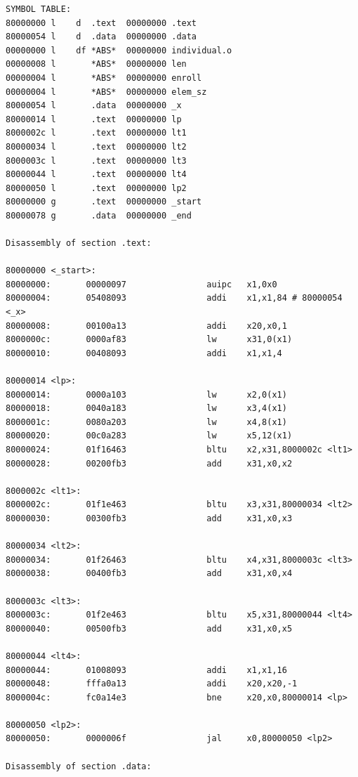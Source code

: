 \begin{lstlisting}[label={common_disasm}, caption=Дизассеблированный код программы для варианта 21]
SYMBOL TABLE:
80000000 l    d  .text  00000000 .text
80000054 l    d  .data  00000000 .data
00000000 l    df *ABS*  00000000 individual.o
00000008 l       *ABS*  00000000 len
00000004 l       *ABS*  00000000 enroll
00000004 l       *ABS*  00000000 elem_sz
80000054 l       .data  00000000 _x
80000014 l       .text  00000000 lp
8000002c l       .text  00000000 lt1
80000034 l       .text  00000000 lt2
8000003c l       .text  00000000 lt3
80000044 l       .text  00000000 lt4
80000050 l       .text  00000000 lp2
80000000 g       .text  00000000 _start
80000078 g       .data  00000000 _end

Disassembly of section .text:

80000000 <_start>:
80000000:       00000097                auipc   x1,0x0
80000004:       05408093                addi    x1,x1,84 # 80000054 <_x>
80000008:       00100a13                addi    x20,x0,1
8000000c:       0000af83                lw      x31,0(x1)
80000010:       00408093                addi    x1,x1,4

80000014 <lp>:
80000014:       0000a103                lw      x2,0(x1)
80000018:       0040a183                lw      x3,4(x1)
8000001c:       0080a203                lw      x4,8(x1)
80000020:       00c0a283                lw      x5,12(x1)
80000024:       01f16463                bltu    x2,x31,8000002c <lt1>
80000028:       00200fb3                add     x31,x0,x2

8000002c <lt1>:
8000002c:       01f1e463                bltu    x3,x31,80000034 <lt2>
80000030:       00300fb3                add     x31,x0,x3

80000034 <lt2>:
80000034:       01f26463                bltu    x4,x31,8000003c <lt3>
80000038:       00400fb3                add     x31,x0,x4

8000003c <lt3>:
8000003c:       01f2e463                bltu    x5,x31,80000044 <lt4>
80000040:       00500fb3                add     x31,x0,x5

80000044 <lt4>:
80000044:       01008093                addi    x1,x1,16
80000048:       fffa0a13                addi    x20,x20,-1
8000004c:       fc0a14e3                bne     x20,x0,80000014 <lp>

80000050 <lp2>:
80000050:       0000006f                jal     x0,80000050 <lp2>

Disassembly of section .data:


\end{lstlisting}
